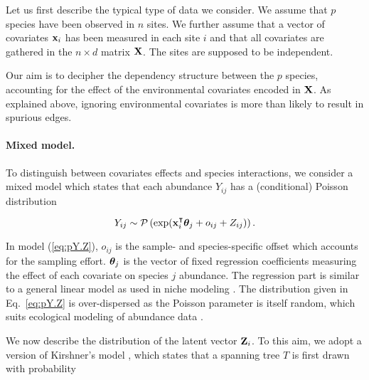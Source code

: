 Let us first describe the typical type of data we consider. We assume that $p$ species have been observed in $n$ sites.  We further assume that a vector of covariates ${\bf x}_i$  has been measured in each site $i$ and that all covariates are gathered in the $n \times d$ matrix ${\bf X}$. The sites are supposed to be independent.

Our aim is to decipher the dependency structure between the $p$ species, accounting for the effect of the environmental covariates encoded in ${\bf X}$. As explained above, ignoring environmental covariates is more than likely to result in spurious edges. 

\paragraph{Mixed model.}
To distinguish between covariates effects and species interactions, we consider a mixed model which states that each abundance $Y_{ij}$ has a (conditional) Poisson distribution
 
\begin{equation} \label{eq:pY.Z}
    Y_{ij} \sim \mathcal{P}\left(\exp({\bf x}_i^\intercal {\boldsymbol{\theta}}_j + o_{ij} + Z_{ij})\right).
\end{equation}
 
In model (\ref{eq:pY.Z}), $o_{ij}$ is the sample- and species-specific offset which accounts for the sampling effort. ${\boldsymbol{\theta}}_j$ is the vector of fixed regression coefficients measuring the effect of each covariate on species $j$ abundance. The regression part is similar to a general linear model as used in niche modeling \citep[see e.g.][]{austin2007species}. 
The distribution given in Eq.~\eqref{eq:pY.Z} is over-dispersed as the Poisson parameter is itself random, which suits ecological modeling of abundance data \citep{Eco_overdisp}.

\bigskip
We now describe the distribution of the latent vector ${\bf Z}_i$. To this aim, we adopt a version of Kirshner's model \citep{kirshner}, which states that a spanning tree $T$ is first drawn with probability
 
